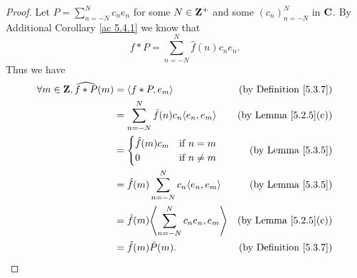 \begin{proof}
    Let \(P = \sum_{n = -N}^N c_n e_n\) for some \(N \in \mathbf{Z}^+\) and some \((c_n)_{n = -N}^N\) in \(\mathbf{C}\).
    By Additional Corollary \ref{ac 5.4.1} we know that
    \[
        f * P = \sum_{n = -N}^N \hat{f}(n) c_n e_n.
    \]
    Thus we have
    \begin{align*}
        \forall m \in \Z, \widehat{f * P}(m) & = \inner{f * P, e_m}                               & \text{(by Definition \ref{5.3.7})} \\
                                             & = \sum_{n = -N}^N \hat{f}(n) c_n \inner{e_n, e_m}  & \text{(by Lemma \ref{5.2.5}(c))}   \\
                                             & = \begin{cases}
                                                     \hat{f}(m) c_m & \text{if } n = m    \\
                                                     0              & \text{if } n \neq m
                                                 \end{cases}            & \text{(by Lemma \ref{5.3.5})}                                \\
                                             & = \hat{f}(m) \sum_{n = -N}^N c_n \inner*{e_n, e_m} & \text{(by Lemma \ref{5.3.5})}      \\
                                             & = \hat{f}(m) \inner*{\sum_{n = -N}^N c_n e_n, e_m} & \text{(by Lemma \ref{5.2.5}(c))}   \\
                                             & = \hat{f}(m) \hat{P}(m).                           & \text{(by Definition \ref{5.3.7})}
    \end{align*}


\end{proof}
